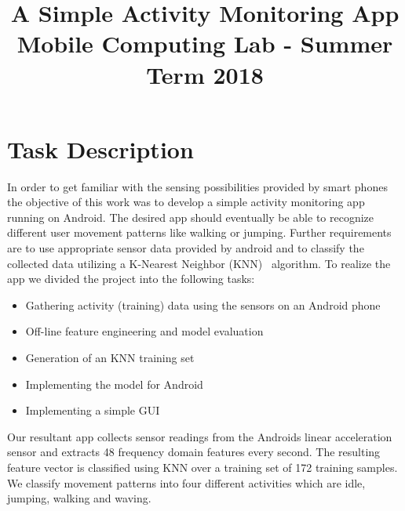 \documentclass[conference]{IEEEtran}
\begin{document}
\title{A Simple Activity Monitoring App\\
{\large Mobile Computing Lab - Summer Term 2018}
}

\author{
\and
{}
}

\maketitle

\section{Task Description}
In order to get familiar with the sensing possibilities provided by smart phones the objective of this work was to develop a simple activity monitoring app running on Android. The desired app should eventually be able to recognize different user movement patterns like walking or jumping. Further requirements are to use appropriate sensor data provided by android and to classify the collected data utilizing a K-Nearest Neighbor (KNN)~\cite{knn1}\cite{knn2} algorithm. To realize the app we divided the project into the following tasks:
\begin{itemize}
\item Gathering activity (training) data using the sensors on an Android phone
\item Off-line feature engineering and model evaluation
\item Generation of an KNN training set
\item Implementing the model for Android
\item Implementing a simple GUI
\end{itemize}

Our resultant app collects sensor readings from the Androids linear acceleration sensor and extracts 48 frequency domain features every second. The resulting feature vector is classified using KNN over a training set of 172 training samples. We classify movement patterns into four different activities which are idle, jumping, walking and waving.
\end{document}
